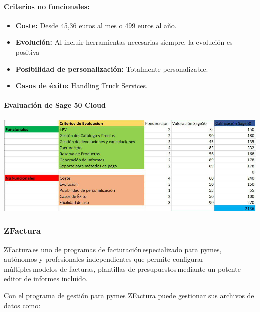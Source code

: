 \documentclass{article}
\begin{document}
\paragraph{Criterios no funcionales:}

\begin{itemize}

	\item \textbf{Coste:} Desde 45,36 euros al mes o 499 euros al año. 
	\item \textbf{Evolución:} Al incluir herramientas necesarias siempre, la evolución es positiva
	\item \textbf{Posibilidad de personalización:} Totalmente personalizable.
	\item \textbf{Casos de éxito:} Handling Truck Services.

\end{itemize}

\paragraph{Evaluación de Sage 50 Cloud}

\begin{flushleft}
	\includegraphics[scale=0.6]{imagenes/Sage50.jpg} 
\end{flushleft}

\subsubsection{ZFactura}

	ZFactura es uno de programas de facturación especializado para pymes, autónomos y profesionales independientes que permite configurar múltiples modelos de facturas, plantillas de presupuestos mediante un potente editor de informes incluído. 

Con el programa de gestión para pymes ZFactura puede gestionar sus archivos de datos como: 
\end{document}
